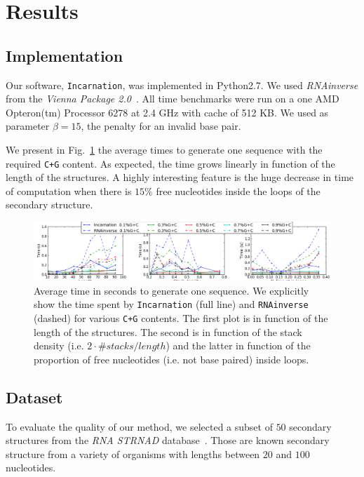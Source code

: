 \section{Results}
\label{sec:results}

\subsection{Implementation}
\label{sec:implementation}
Our software, \texttt{Incarnation}, was implemented in Python2.7. We used
\emph{RNAinverse} from the \textit{Vienna Package 2.0}~\cite{Hofacker:1994}.
All time benchmarks were run on a one AMD Opteron(tm) Processor 6278  at 2.4 GHz with cache of 512 KB.
 We used as parameter $\beta=15$, the penalty for an invalid base pair.



We present in Fig.~\ref{fig:time} the average times to generate one sequence
with the required \texttt{C+G} content. As expected, the time grows linearly
in function of the length of the structures.  A highly interesting feature
is the huge decrease in time of computation when there is $15\%$ free 
nucleotides inside the loops of the secondary structure.

\begin{figure}[ht!]
	\centering
	\includegraphics[scale=0.45]{Figures/time_rnastrand_clustered_rnainverse_100samples_fix}
	\caption{Average time in seconds to generate one sequence. We explicitly show 
	the time spent by \texttt{Incarnation} (full line) and \texttt{RNAinverse} (dashed) for various \texttt{C+G} contents. The first plot is in function
	of the length of the structures. The second is in function of the stack
	density (i.e. $2\cdot\#stacks/length$) and the latter in function of 
	the proportion of free nucleotides (i.e. not base paired) inside loops.}
	\label{fig:time}	
\end{figure}



\subsection{Dataset}
To evaluate the quality of our method, we selected a subset of $50$ secondary
structures from the \textit{RNA STRNAD} database~\cite{andronescu2008rna}.
Those are known secondary structure from a variety of organisms with 
 lengths between $20$ and $100$ nucleotides. 
 
